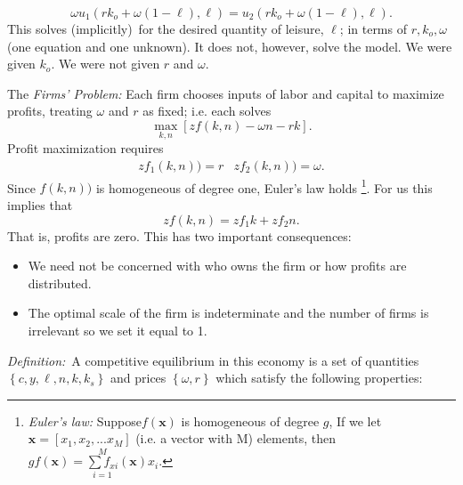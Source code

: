 \documentclass{sebase}
\begin{document}
\begin{equation*}
\omega u_{1}(rk_{o}+\omega \left( 1-\ell \right) ,\ell )=u_{2}(rk_{o}+\omega
\left( 1-\ell \right) ,\ell ).
\end{equation*}%
This solves (implicitly)\ for the desired quantity of leisure, $\ell $; in
terms of $r,k_{o},\omega $ (one equation and one unknown). It does not,
however, solve the model. We were given $k_{o}.$ We were not given $r$ and $%
\omega .$

\pagebreak

The \textit{Firms' Problem: }Each firm chooses inputs of labor and capital
to maximize profits, treating $\omega $ and $r$ as fixed; i.e. each solves%
\begin{equation*}
\underset{k,n}{\max }\left[ zf\left( k,n\right) -\omega n-rk\right] .
\end{equation*}%
Profit maximization requires 
\begin{equation*}
\begin{array}{ll}
zf_{1}\left( k,n\right) )=r & zf_{2}\left( k,n\right) )=\omega .%
\end{array}%
\end{equation*}%
Since $f\left( k,n\right) )$ is homogeneous of degree one, Euler's law holds%
\footnote{\textit{Euler's law:} Suppose$f\left( \mathbf{x}\right) $ is
homogeneous of degree $g$, If we let $\mathbf{x}=\left[ x_{1},x_{2},...x_{M}%
\right] $ (i.e. a vector with M) elements, then $gf\left( \mathbf{x}\right) =%
\overset{M}{\underset{i=1}{\sum f_{xi}}}\left( \mathbf{x}\right) x_{i}.$}.
For us this implies that 
\begin{equation*}
zf(k,n)=zf_{1}k+zf_{2}n.
\end{equation*}%
That is, profits are zero. This has two important consequences:

\begin{itemize}
\item We need not be concerned with who owns the firm or how profits are
distributed.

\item The optimal scale of the firm is indeterminate and the number of firms
is irrelevant so we set it equal to 1.
\end{itemize}

\pagebreak

\noindent \textit{Definition:}\ A competitive equilibrium in this economy is
a set of quantities $\left\{ c,y,\ell ,n,k,k_{s}\right\} $ and prices $%
\left\{ \omega ,r\right\} $ which satisfy the following properties:
\end{document}
